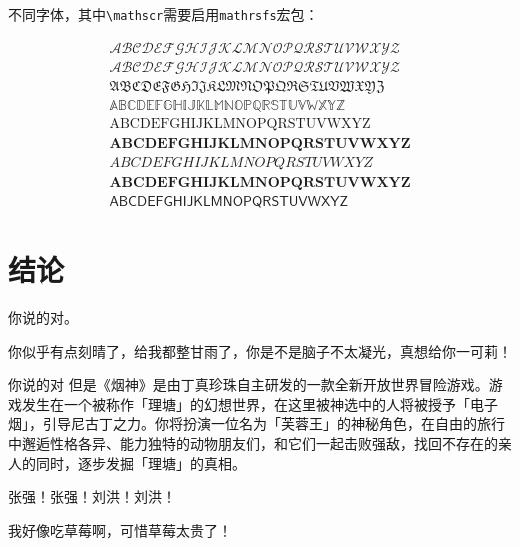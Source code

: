 不同字体，其中\verb|\mathscr|需要启用\verb|mathrsfs|宏包：

\begin{equation}
\label{hello}
    \begin{array}{c}
        \mathscr{ABCDEFGHIJKLMNOPQRSTUVWXYZ} \\
        \mathcal{ABCDEFGHIJKLMNOPQRSTUVWXYZ} \\
        \mathfrak{ABCDEFGHIJKLMNOPQRSTUVWXYZ} \\
        \mathbb{ABCDEFGHIJKLMNOPQRSTUVWXYZ} \\
        \mathrm{ABCDEFGHIJKLMNOPQRSTUVWXYZ} \\
        \mathbf{ABCDEFGHIJKLMNOPQRSTUVWXYZ} \\
        ABCDEFGHIJKLMNOPQRSTUVWXYZ \\
        \boldsymbol{ABCDEFGHIJKLMNOPQRSTUVWXYZ} \\
        \mathsf{ABCDEFGHIJKLMNOPQRSTUVWXYZ}
    \end{array}
\end{equation}



\chapter*{结\quad 论}

你说的对。

你似乎有点刻晴了，给我都整甘雨了，你是不是脑子不太凝光，真想给你一可莉！

你说的对 但是《烟神》是由丁真珍珠自主研发的一款全新开放世界冒险游戏。游戏发生在一个被称作「理塘」的幻想世界，在这里被神选中的人将被授予「电子烟」，引导尼古丁之力。你将扮演一位名为「芙蓉王」的神秘角色，在自由的旅行中邂逅性格各异、能力独特的动物朋友们，和它们一起击败强敌，找回不存在的亲人的同时，逐步发掘「理塘」的真相。

张强！张强！刘洪！刘洪！

我好像吃草莓啊，可惜草莓太贵了！

